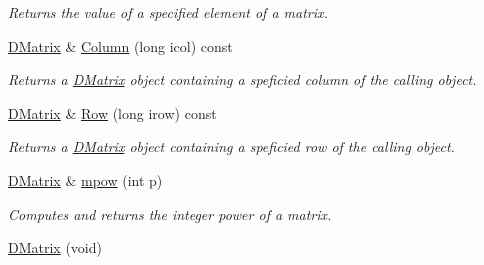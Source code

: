 \begin{DoxyCompactItemize}
\begin{DoxyCompactList}\small\item\em Returns the value of a specified element of a matrix. \item\end{DoxyCompactList}\item 
\hyperlink{classDMatrix}{DMatrix} \& \hyperlink{classDMatrix_add29fc33eedb04efe3950fcc4c2a31dd}{Column} (long icol) const 
\begin{DoxyCompactList}\small\item\em Returns a \hyperlink{classDMatrix}{DMatrix} object containing a speficied column of the calling object. \item\end{DoxyCompactList}\item 
\hyperlink{classDMatrix}{DMatrix} \& \hyperlink{classDMatrix_a90261694eb6d26818dfbebbe099c1373}{Row} (long irow) const 
\begin{DoxyCompactList}\small\item\em Returns a \hyperlink{classDMatrix}{DMatrix} object containing a speficied row of the calling object. \item\end{DoxyCompactList}\item 
\hyperlink{classDMatrix}{DMatrix} \& \hyperlink{classDMatrix_aeb2c289d9a40b0869f2fef29ffd6340e}{mpow} (int p)
\begin{DoxyCompactList}\small\item\em Computes and returns the integer power of a matrix. \item\end{DoxyCompactList}\item 
\hypertarget{classDMatrix_a631c638e92b0b7964f42b11addbaaa01}{
\hyperlink{classDMatrix_a631c638e92b0b7964f42b11addbaaa01}{DMatrix} (void)}
\label{classDMatrix_a631c638e92b0b7964f42b11addbaaa01}


\end{DoxyCompactItemize}

